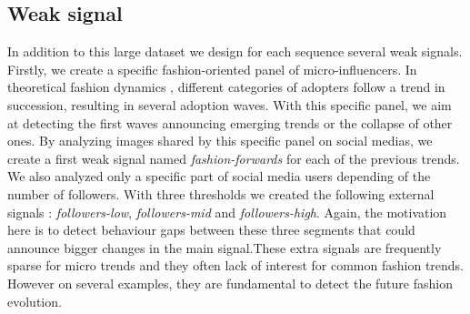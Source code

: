 \documentclass{article} %
\begin{document}
\subsection{Weak signal}

In addition to this large dataset we design for each sequence several weak signals.  Firstly, we create a specific fashion-oriented panel of micro-influencers. In theoretical fashion dynamics \citep{rogersdiffusion}, different categories of adopters follow a trend in succession, resulting in several adoption waves. With this specific panel, we aim at detecting the first waves announcing emerging trends or the collapse of other ones. By analyzing images shared by this specific panel on social medias, we create a first weak signal named \textit{fashion-forwards} for each of the previous trends. We also analyzed only a specific part of social media users depending of the number of followers. With three thresholds we created the following external signals : \textit{followers-low}, \textit{followers-mid} and \textit{followers-high}. Again, the motivation here is to detect behaviour gaps between these three segments that could announce bigger changes in the main signal.These extra signals are frequently sparse for micro trends and they often lack of interest for common fashion trends. However on several examples, they are fundamental to detect the future fashion evolution. 










\end{document}
